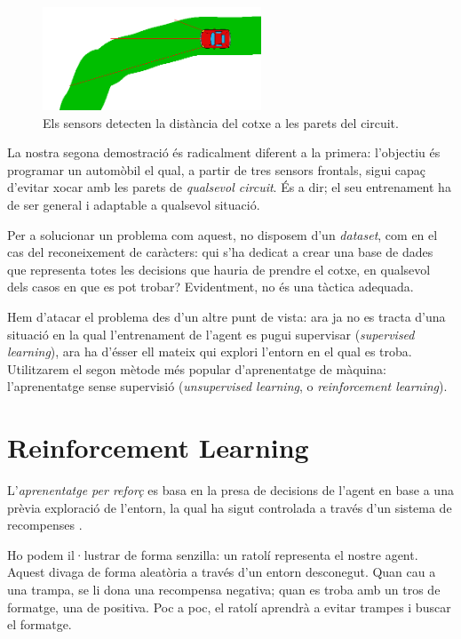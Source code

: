 \begin{figure}[ht!]
\centering
\includegraphics[width=65mm]{data/car1.png}
\caption{Els sensors detecten la distància del cotxe a les parets del circuit.}
\label{sensors}
\end{figure}

La nostra segona demostració és radicalment diferent a la primera:
l'objectiu és programar un automòbil el qual, a partir de tres sensors frontals,
sigui capaç d'evitar xocar amb les parets de \emph{qualsevol circuit}.
És a dir; el seu entrenament ha de ser general i adaptable a qualsevol situació.

Per a solucionar un problema com aquest, no disposem d'un \emph{dataset},
com en el cas del reconeixement de caràcters: qui s'ha dedicat a crear
una base de dades que representa totes les decisions que hauria de prendre
el cotxe, en qualsevol dels casos en que es pot trobar? Evidentment, no és
una tàctica adequada.

Hem d'atacar el problema des d'un altre punt de vista: ara ja no es tracta
d'una situació en la qual l'entrenament de l'agent es pugui supervisar
(\emph{supervised learning}), ara ha d'ésser ell mateix qui explori l'entorn
en el qual es troba. Utilitzarem el segon mètode més popular d'aprenentatge
de màquina: l'aprenentatge sense supervisió (\emph{unsupervised learning}, o \emph{reinforcement learning}).
\\

\section{Reinforcement Learning}
L'\emph{aprenentatge per reforç} es basa en la presa de decisions de l'agent en base
a una prèvia exploració de l'entorn, la qual ha sigut controlada a través d'un sistema
de recompenses \cite{reinflnbk}.

Ho podem il·lustrar de forma senzilla: un ratolí representa el nostre agent. Aquest divaga
de forma aleatòria a través d'un entorn desconegut. Quan cau a una trampa, se li dona una
recompensa negativa; quan es troba amb un tros de formatge, una de positiva. Poc a poc,
el ratolí aprendrà a evitar trampes i buscar el formatge.
